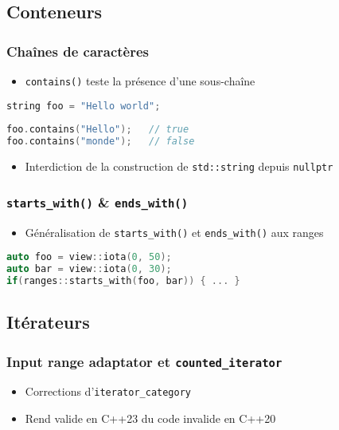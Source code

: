 \documentclass[C++.tex]{subfiles}
\begin{document}
\subsection*{Conteneurs}
\begin{frame}[fragile]
	\frametitle{Chaînes de caractères}
	\begin{itemize}
		\item \lstinline|contains()| teste la présence d'une sous-chaîne
	\end{itemize}

	\begin{lstlisting}[language=C++]
string foo = "Hello world";
	
foo.contains("Hello");   // true
foo.contains("monde");   // false\end{lstlisting}


	\begin{itemize}
		\item Interdiction de la construction de \lstinline|std::string| depuis \lstinline|nullptr|

	\end{itemize}
\end{frame}

\begin{frame}[fragile]
	\frametitle{\lstinline|starts_with()| \& \lstinline|ends_with()|}
	\begin{itemize}
		\item Généralisation de \lstinline|starts_with()| et \lstinline|ends_with()| aux ranges
	\end{itemize}

	\begin{lstlisting}[language=C++]
auto foo = view::iota(0, 50);
auto bar = view::iota(0, 30);
if(ranges::starts_with(foo, bar)) { ... }\end{lstlisting}
\end{frame}

\subsection*{Itérateurs}
\begin{frame}[fragile]
	\frametitle{Input range adaptator et \lstinline|counted_iterator|}
	\begin{itemize}
		\item Corrections d'\lstinline|iterator_category|
		\item Rend valide en C++23 du code invalide en C++20
	\end{itemize}
\end{frame}
\end{document}
